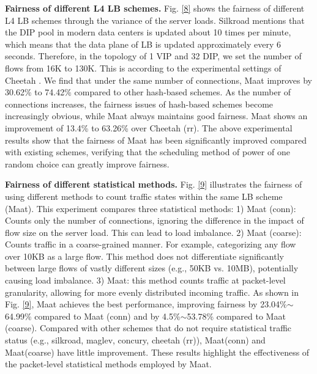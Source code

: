  \textbf{Fairness of different L4 LB schemes.} Fig. \ref{8} shows the fairness of different L4 LB schemes through the variance of the server loads. Silkroad \cite{miao2017silkroad} mentions that the DIP pool in modern data centers is updated about 10 times per minute, which means that the data plane of LB is updated approximately every 6 seconds. Therefore, in the topology of 1 VIP and 32 DIP, we set the number of flows from 16K to 130K. This is according to the experimental settings of Cheetah \cite{barbette2021cheetah}. We find that under the same number of connections, Maat improves by 30.62\% to 74.42\% compared to other hash-based schemes. As the number of connections increases, the fairness issues of hash-based schemes become increasingly obvious, while Maat always maintains good fairness. Maat shows an improvement of 13.4\% to 63.26\% over Cheetah (rr). The above experimental results show that the fairness of Maat has been significantly improved compared with existing schemes, verifying that the scheduling method of power of one random choice can greatly improve fairness.
 
 \textbf{Fairness of different statistical methods.} Fig. \ref{9} illustrates the fairness of using different methods to count traffic states within the same LB scheme (Maat). This experiment compares three statistical methods: 1) Maat (conn): Counts only the number of connections, ignoring the difference in the impact of flow size on the server load. This can lead to load imbalance. 2) Maat (coarse): Counts traffic in a coarse-grained manner. For example, categorizing any flow over 10KB as a large flow. This method does not differentiate significantly between large flows of vastly different sizes (e.g., 50KB vs. 10MB), potentially causing load imbalance. 3) Maat: this method counts traffic at packet-level granularity, allowing for more evenly distributed incoming traffic. As shown in Fig. \ref{9}, Maat achieves the best performance, improving fairness by 23.04\%$\sim$64.99\% compared to Maat (conn) and by 4.5\%$\sim$53.78\% compared to Maat (coarse). Compared with other schemes that do not require statistical traffic status (e.g., silkroad, maglev, concury, cheetah (rr)), Maat(conn) and Maat(coarse) have little improvement. These results highlight the effectiveness of the packet-level statistical methods employed by Maat.
 
